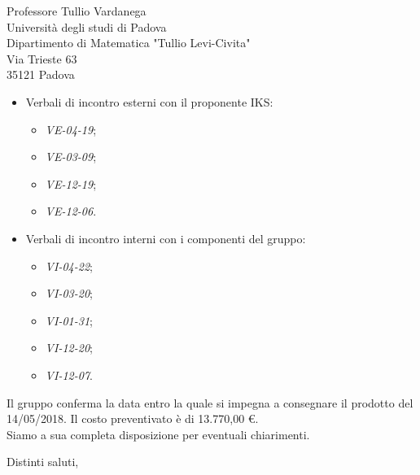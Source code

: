 \documentclass[12pt]{letter} %
\begin{document}
\begin{letter}{Professore Tullio Vardanega \\ Università degli studi di Padova \\ Dipartimento di Matematica "Tullio Levi-Civita" \\ Via Trieste 63 \\ 35121 Padova}
\begin{addmargin}[2em]{2em}
\begin{itemize}
      \item Verbali di incontro esterni con il proponente IKS: \begin{itemize}
      	\item \emph{VE-04-19};
      	\item \emph{VE-03-09};
      	\item \emph{VE-12-19};
      	\item \emph{VE-12-06}.
      \end{itemize}
      \item Verbali di incontro interni con i componenti del gruppo:
      \begin{itemize}
      	\item \emph{VI-04-22};
      	\item \emph{VI-03-20};
      	\item \emph{VI-01-31};
      	\item \emph{VI-12-20};
      	\item \emph{VI-12-07}.
      \end{itemize}
      \end{itemize}
  Il gruppo conferma la data entro la quale si impegna a consegnare il prodotto del 14/05/2018. Il costo preventivato è di 13.770,00 \euro. \\ Siamo a sua completa disposizione per eventuali chiarimenti.
\end{addmargin}

\closing{Distinti saluti,}





\end{letter}
 
\end{document}
